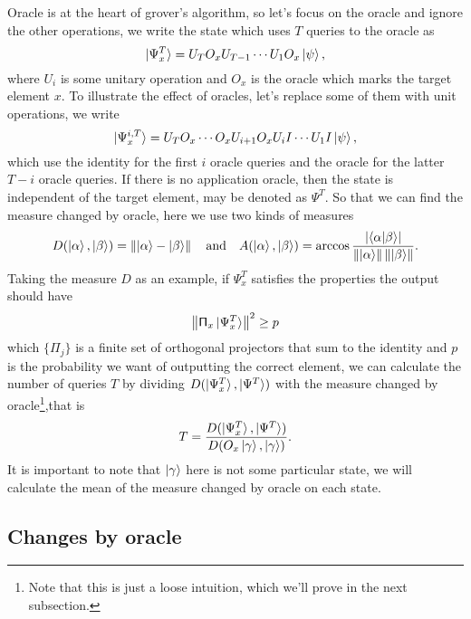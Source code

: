 \documentclass[a4paper,10pt]{article}
\numberwithin{equation}{subsection}
\begin{document}
Oracle is at the heart of grover's algorithm, so let's focus on the oracle and ignore the other operations, we write the state which uses $T$ queries to the oracle as
\begin{equation}
    \ket{\Psi_{x}^{T}}=U_{T}O_{x}U_{T-1}\cdots U_{1}O_{x}\ket{\psi},
\end{equation}
where $U_{i}$ is some unitary operation and $O_{x}$ is the oracle which marks the target element $x$. To illustrate the effect of oracles, let's replace some of them with unit operations, we write
\begin{equation}
    \ket{\Psi_{x}^{i,T}}=U_{T}O_{x}\cdots O_{x}U_{i+1}O_{x}U_{i}I\cdots U_{1}I\ket{\psi},
\end{equation}
which use the identity for the first $i$ oracle queries and the oracle for the latter $T-i$ oracle queries. If there is no application oracle,  then the state is independent of the target element, may be denoted as $\Psi^{T}$. So that we can find the measure changed by oracle, here we use two kinds of measures
\begin{equation}
    D(\ket{\alpha},\ket{\beta})=\left\|\ket{\alpha}-\ket{\beta}\right\|
    \quad\text{and}\quad
    A(\ket{\alpha},\ket{\beta})=\arccos\frac{\left\lvert \braket{\alpha|\beta}\right\rvert}{\left\|\ket{\alpha}\right\|\left\|\ket{\beta}\right\|}.
\end{equation}
Taking the measure $D$ as an example, if $\Psi_{x}^{T}$ satisfies the properties the output should have
\begin{equation}
    \left\| \mathsf{\Pi}_{x}\ket{\Psi_{x}^{T}} \right\|^{2} \geq p
\end{equation}
which $\{\mathsf{\Pi}_{j}\}$ is a finite set of orthogonal projectors that sum to the identity and $p$ is the probability we want of outputting the correct element, we can calculate the number of queries $T$ by dividing $D(\ket{\Psi_{x}^{T}},\ket{\Psi^{T}})$ with the measure changed by oracle\footnote{Note that this is just a loose intuition, which we'll prove in the next subsection.},that is
\begin{equation}
    T=\frac{D(\ket{\Psi_{x}^{T}},\ket{\Psi^{T}})}{D(O_{x}\ket{\gamma},\ket{\gamma})}.
\end{equation}
It is important to note that $\ket{\gamma}$ here is not some particular state, we will calculate the mean of the measure changed by oracle on each state.



\subsection{Changes by oracle}
\end{document}
